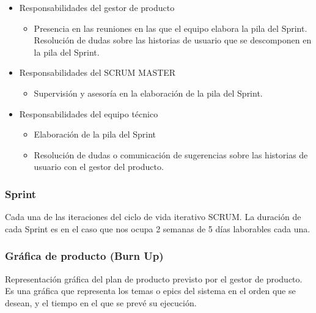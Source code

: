 	\begin{itemize}
		\item Responsabilidades del gestor de producto
		\begin{itemize}
			\item Presencia en las reuniones en las que el equipo elabora la pila del Sprint. Resolución de dudas sobre las historias de usuario que se descomponen en la pila del Sprint.
		\end{itemize}	 
		\item Responsabilidades del SCRUM MASTER
		\begin{itemize}
			\item	Supervisión y asesoría en la elaboración de la pila del Sprint.
		\end{itemize}	
		\item Responsabilidades del equipo técnico
		\begin{itemize}
			\item	Elaboración de la pila del Sprint 
			\item	Resolución de dudas o comunicación de sugerencias sobre las historias de usuario con el gestor del producto.
		\end{itemize}
	\end{itemize}	

\subsubsection{Sprint}
\hspace*{2em}Cada una de las iteraciones del ciclo de vida iterativo SCRUM. La duración de cada Sprint es en el caso que nos ocupa 2 semanas de 5 días laborables cada una.

\subsubsection{Gráfica de producto (Burn Up)}
\hspace*{2em}Representación gráfica del plan de producto previsto por el gestor de producto. Es una gráfica que representa los temas o epics del sistema en el orden que se desean, y el tiempo en el que se prevé su ejecución. 

